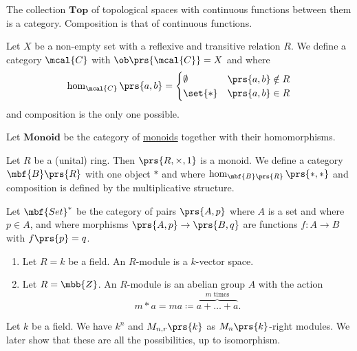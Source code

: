 \documentclass[11pt]{kbook}
\begin{document}
\begin{example}
The collection $\mathbf{Top}$ of topological spaces with continuous functions between them is a category. Composition is that of continuous functions.
\end{example}

\begin{example}
Let $X$ be a non-empty set with a reflexive and transitive relation $R$. We define a category $\mcal{C}$ with $\ob\prs{\mcal{C}} = X$ and where
\[\hom_{\mcal{C}}\prs{a,b} = \begin{cases}\emptyset & \prs{a,b} \notin R \\ \set{*} & \prs{a,b} \in R\end{cases}\]
and composition is the only one possible.
\end{example}

\begin{example}
Let $\mathbf{Monoid}$ be the category of \href{https://en.wikipedia.org/wiki/Monoid}{monoids} together with their homomorphisms.
\end{example}

\begin{example}
Let $R$ be a (unital) ring. Then $\prs{R, \times, 1}$ is a monoid. We define a category $\mbf{B}\prs{R}$ with one object $*$ and where $\hom_{\mbf{B}\prs{R}}\prs{*, *}$ and composition is defined by the multiplicative structure.
\end{example}

\begin{example}
Let $\mbf{Set}^*$ be the category of pairs $\prs{A,p}$ where $A$ is a set and where $p \in A$, and where morphisms $\prs{A,p} \to \prs{B,q}$ are functions $f \colon A \to B$ with $f\prs{p} = q$.
\end{example}

\begin{example}
\begin{enumerate}
\item Let $R = k$ be a field. An $R$-module is a $k$-vector space.

\item Let $R = \mbb{Z}$. An $R$-module is an abelian group $A$ with the action
\[ m * a = ma \coloneqq \overset{\text{$m$ times}}{\overbrace{a + \ldots + a}} \text{.} \]
\end{enumerate}
\end{example}

\begin{example}
Let $k$ be a field. We have $k^n$ and $M_{n, r}\prs{k}$ as $M_n\prs{k}$-right modules. We later show that these are all the possibilities, up to isomorphism.
\end{example}
\end{document}

